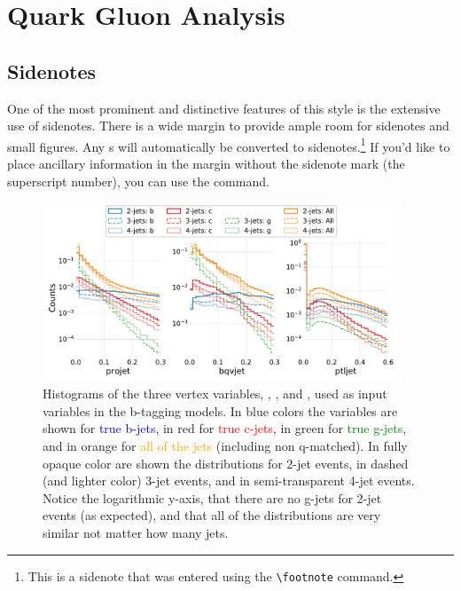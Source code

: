 
\chapter{Quark Gluon Analysis}
\label{ch:quark_gluon_analysis}

\section{Sidenotes}\label{sec:sidenotes}
One of the most prominent and distinctive features of this style is the
extensive use of sidenotes.  There is a wide margin to provide ample room
for sidenotes and small figures.  Any s will automatically
be converted to sidenotes.\footnote{This is a sidenote that was entered
using the \texttt{\textbackslash footnote} command.}  If you'd like to place ancillary
information in the margin without the sidenote mark (the superscript
number), you can use the  command.





\begin{figure}
  \includegraphics[width=0.95\textwidth, trim=0 0 0 0, clip]{figures/quarks/btagging_variables_hist-down_sample=1.00-ML_vars=vertex-selection=b-ejet_min=4-n_iter_RS_lgb=99-n_iter_RS_xgb=9-cdot_cut=0.90-version=19.pdf}
  \caption[Histograms of the vertex variables]
          {Histograms of the three vertex variables, , , and , used as input variables in the b-tagging models. In blue colors the variables are shown for \textcolor{blue}{true b-jets}, in red for \textcolor{red}{true c-jets}, in green for \textcolor{green}{true g-jets}, and in orange for \textcolor{orange}{all of the jets} (including non q-matched). In fully opaque color are shown the distributions for 2-jet events, in dashed (and lighter color) 3-jet events, and in semi-transparent 4-jet events. Notice the logarithmic y-axis, that there are no g-jets for 2-jet events (as expected), and that all of the distributions are very similar not matter how many jets.
          } 
  \label{fig:q:vertex_variables}
\end{figure}




